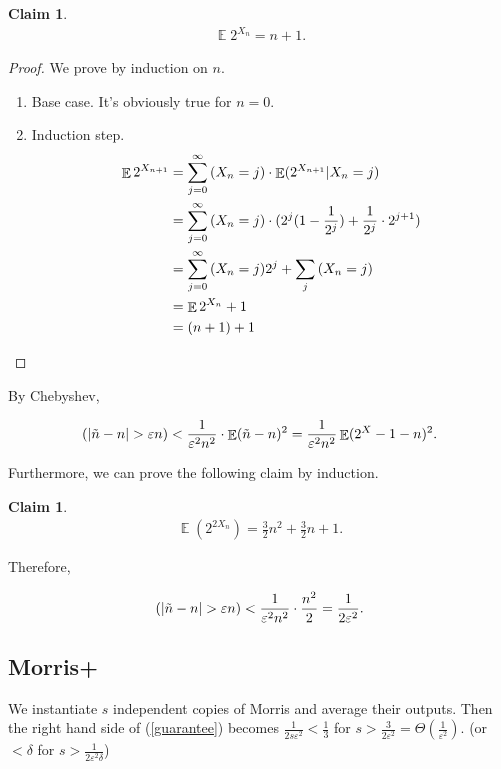 \documentclass[11pt]{article}
\DeclareMathOperator*{\E}{\mathbb{E}}
\let\Pr\relax
\DeclareMathOperator*{\Pr}{\mathbb{P}}
\newtheorem{claim}[theorem]{Claim}
\begin{document}
\begin{claim}
\begin{align}
\E 2^{X_n}=n+1.
\end{align}
\end{claim}

\begin{proof}
We prove by induction on $n$. 

\begin{enumerate}
\item{Base case. It's obviously true for $n=0$.}

\item{
Induction step. 
\begin{equation}
\begin{split}
\E 2^{X_{n+1}} &= \sum_{j=0}^{\infty}{\Pr(X_n=j)\cdot \E(2^{X_{n+1}}|X_n=j)} \\
&=\sum_{j=0}^{\infty}{\Pr (X_n=j) \cdot (2^j(1-\frac{1}{2^j})+\frac{1}{2^j}\cdot 2^{j+1})} \\
&= \sum_{j=0}^{\infty}{\Pr (X_n=j)2^j} + \sum_{j}{\Pr (X_n = j)} \\
&=\E 2^{X_n} +1 \\
&= (n+1) + 1 \\
\end{split}
\end{equation}
}
\end{enumerate}

\end{proof}

By Chebyshev,

\begin{align}
\Pr(|\tilde{n}-n|>\varepsilon n) < \frac{1}{\varepsilon^2n^2}\cdot \E(\tilde{n}-n)^2=\frac{1}{\varepsilon^2n^2} \E(2^X-1-n)^2.
\end{align}

Furthermore, we can prove the following claim by induction.

\begin{claim}
\begin{align}
\E (2^{2X_n}) = \frac{3}{2}n^2+\frac{3}{2}n+1.
\end{align}
\end{claim}

Therefore, 

\begin{align}
\Pr (|\tilde{n}-n|>\varepsilon n)<\frac{1}{\varepsilon^2n^2}\cdot \frac{n^2}{2}=\frac{1}{2\varepsilon^2}. \label{guarantee}
\end{align}

\subsection{Morris+}
We instantiate $s$ independent copies of Morris and average their outputs. 
Then the right hand side of (\ref{guarantee}) becomes $\frac{1}{2s\varepsilon^2}<\frac{1}{3}$ for $s>\frac{3}{2\varepsilon^2}=\Theta(\frac{1}{\varepsilon^2})$. (or $<\delta$ for $s>\frac{1}{2\varepsilon^2\delta}$)
\end{document}
